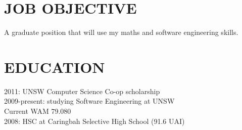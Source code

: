 \documentclass{res}
\begin{document}
 


\address{16A Old Forest Rd \\  Lugarno, NSW 2210
         \\  grasevski@gmail.com
         \\  0405 634 067}
                                  
\begin{resume}

\section{JOB OBJECTIVE}          
    A graduate position that will use my maths and software engineering skills.
 
\section{EDUCATION}          
    2011: UNSW Computer Science Co-op scholarship \\
    2009-present: studying Software Engineering at UNSW \\
    Current WAM 79.080 \\
    2008: HSC at Caringbah Selective High School (91.6 UAI)

 

\end{resume}
\end{document}
